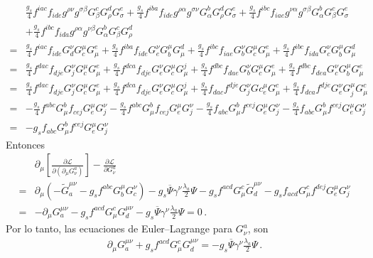 \begin{align}
  &\frac{g_s}{4}f^{iac}f_{ide}g^{\rho\nu}g^{\sigma\beta}G^c_\beta G^d_\rho G^e_\sigma
+\frac{g_s}{4}f^{iba}f_{ide}g^{\rho\alpha}g^{\sigma\nu}G^b_{\alpha}G^d_\rho G^e_\sigma
+\frac{g_s}{4}f^{ibc}f_{iae}g^{\nu\alpha}g^{\sigma\beta}G^b_{\alpha}G^c_\beta G^e_\sigma\nonumber\\
&+\frac{g_s}{4}f^{ibc}f_{ida}g^{\rho\alpha}g^{\nu\beta}G^b_{\alpha}G^c_\beta G^d_\rho\nonumber\\
=&\frac{g_s}{4}f^{iac}f_{ide}G_d^\nu G_c^\mu G^e_\mu
+\frac{g_s}{4}f^{iba}f_{ide}G_e^\nu G_b^{\mu}G^d_\mu
+\frac{g_s}{4}f^{ibc}f_{iae}G_b^{\nu}G_c^\mu G^e_\mu
+\frac{g_s}{4}f^{ibc}f_{ida}G_c^\nu G_b^{\mu}G^d_\mu\nonumber\\
=&  \frac{g_s}{4}f^{dac}f_{dje}G_j^\nu G_c^\mu G^e_\mu
+\frac{g_s}{4}f^{dca}f_{dje}G_e^\nu G_c^{\mu}G^j_\mu
+\frac{g_s}{4}f^{dbc}f_{dae}G_b^{\nu}G_c^\mu G^e_\mu
+\frac{g_s}{4}f^{dbc}f_{dea}G_c^\nu G_b^{\mu}G^e_\mu\nonumber\\
=&  \frac{g_s}{4}f^{dac}f_{dje}G_j^\nu G_c^\mu G^e_\mu
+\frac{g_s}{4}f^{dca}f_{dje}G_e^\nu G_c^{\mu}G^j_\mu
+\frac{g_s}{4}f_{dac}f^{dje}G_j^{\nu}Gc_e^\mu G^c_\mu
+\frac{g_s}{4}f_{dca}f^{dje}G_e^\nu G_j^{\mu}G^c_\mu\nonumber\\
=&  -\frac{g_s}{4}f^{abc}G^b_\mu f_{cej}G_e^\mu G_j^\nu
-\frac{g_s}{4}f^{abc}G^b_{\mu}f_{cej}G_e^\mu G_j^\nu
-\frac{g_s}{4}f_{abc}G^b_\mu f^{cej}G_e^\mu G_j^{\nu}
-\frac{g_s}{4}f_{abc}G^b_\mu f^{cej}G_e^{\mu}G_j^\nu\nonumber\\
=&-g_sf_{abc}G^b_\mu f^{cej}G_e^{\mu}G_j^\nu
\end{align}
Entonces
\begin{align}
    &\partial_\mu\left[\frac{\partial\mathcal{L}}{\partial\left(\partial_\mu G_\nu^a\right)}\right]-\frac{\partial\mathcal{L}}{\partial G_\nu^a}\nonumber\\
    =&\partial_\mu\left(-  \widetilde{G}^{\mu\nu}_a-g_s f^{abc}G_b^\mu G^\nu_c
\right)
-g_s\overline{\Psi}\gamma^\nu\frac{\lambda_a}{2}\Psi
-g_s f^{acd}G^c_\mu\widetilde{G}^{\mu\nu}_d
-g_sf_{acd}G^c_\mu f^{dej}G_e^{\mu}G_j^\nu\nonumber\\
      =&-\partial_\mu{G}^{\mu\nu}_a-g_s f^{acd}G^c_\mu{G}^{\mu\nu}_d
-g_s\overline{\Psi}\gamma^\nu\frac{\lambda_a}{2}\Psi=0\,.
\end{align}
Por lo tanto, las ecuaciones de Euler--Lagrange para $G_\nu^a$, son
\begin{align}
\label{eq:Gmuael}
\partial_\mu{G}^{\mu\nu}_a+g_s f^{acd}G^c_\mu{G}^{\mu\nu}_d
=-g_s\overline{\Psi}\gamma^\nu\frac{\lambda_a}{2}\Psi\,.
\end{align}
